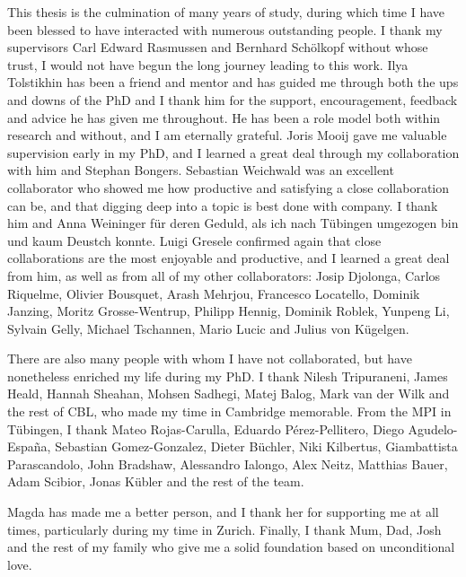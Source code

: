 
\begin{acknowledgements}      


This thesis is the culmination of many years of study, during which time I have been blessed to have interacted with numerous outstanding people.
I thank my supervisors Carl Edward Rasmussen and Bernhard Sch\"olkopf without whose trust, I would not have begun the long journey leading to this work.
Ilya Tolstikhin has been a friend and mentor and has guided me through both the ups and downs of the PhD and I thank him for the support, encouragement, feedback and advice he has given me throughout. He has been a role model both within research and without, and I am eternally grateful.
Joris Mooij gave me valuable supervision early in my PhD, and I learned a great deal through my collaboration with him and Stephan Bongers.
Sebastian Weichwald was an excellent collaborator who showed me how productive and satisfying a close collaboration can be, and that digging deep into a topic is best done with company. I thank him and Anna Weininger f\"ur deren Geduld, als ich nach T\"ubingen umgezogen bin und kaum Deustch konnte.
Luigi Gresele confirmed again that close collaborations are the most enjoyable and productive, and I learned a great deal from him, as well as from all of my other collaborators:
Josip Djolonga, Carlos Riquelme, Olivier Bousquet, Arash Mehrjou, Francesco Locatello, Dominik Janzing, Moritz Grosse-Wentrup, Philipp Hennig, Dominik Roblek, Yunpeng Li, Sylvain Gelly, Michael Tschannen, Mario Lucic and Julius von K\"ugelgen.

There are also many people with whom I have not collaborated, but have nonetheless enriched my life during my PhD.
I thank Nilesh Tripuraneni, James Heald, Hannah Sheahan, Mohsen Sadhegi, Matej Balog, Mark van der Wilk and the rest of CBL, who made my time in Cambridge memorable.
From the MPI in T\"ubingen, I thank Mateo Rojas-Carulla, Eduardo Pérez-Pellitero, Diego Agudelo-Espa\~{n}a, Sebastian Gomez-Gonzalez, Dieter B\"uchler, Niki Kilbertus, Giambattista Parascandolo, John Bradshaw, Alessandro Ialongo, Alex Neitz, Matthias Bauer, Adam Scibior, Jonas K\"ubler and the rest of the team. 

Magda has made me a better person, and I thank her for supporting me at all times, particularly during my time in Zurich.
Finally, I thank Mum, Dad, Josh and the rest of my family who give me a solid foundation based on unconditional love.





\end{acknowledgements}
